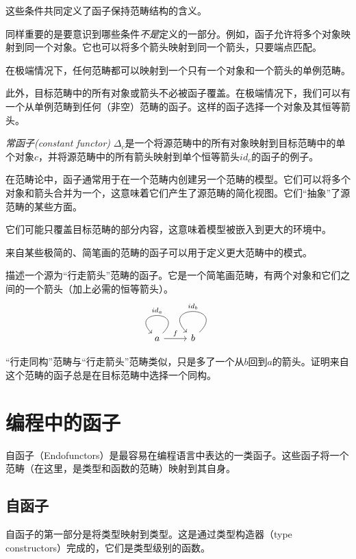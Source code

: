 \documentclass[DaoFP]{subfiles}
\begin{document}
这些条件共同定义了函子保持范畴结构的含义。

同样重要的是要意识到哪些条件\emph{不是}定义的一部分。例如，函子允许将多个对象映射到同一个对象。它也可以将多个箭头映射到同一个箭头，只要端点匹配。

在极端情况下，任何范畴都可以映射到一个只有一个对象和一个箭头的单例范畴。

此外，目标范畴中的所有对象或箭头不必被函子覆盖。在极端情况下，我们可以有一个从单例范畴到任何（非空）范畴的函子。这样的函子选择一个对象及其恒等箭头。

\emph{常函子(constant functor)} $\Delta_c$是一个将源范畴中的所有对象映射到目标范畴中的单个对象$c$，并将源范畴中的所有箭头映射到单个恒等箭头$id_c$的函子的例子。

在范畴论中，函子通常用于在一个范畴内创建另一个范畴的模型。它们可以将多个对象和箭头合并为一个，这意味着它们产生了源范畴的简化视图。它们“抽象”了源范畴的某些方面。

它们可能只覆盖目标范畴的部分内容，这意味着模型被嵌入到更大的环境中。

来自某些极简的、简笔画的范畴的函子可以用于定义更大范畴中的模式。

\begin{exercise}
描述一个源为“行走箭头”范畴的函子。它是一个简笔画范畴，有两个对象和它们之间的一个箭头（加上必需的恒等箭头）。
\[
 \begin{tikzcd}
 a 
  \arrow[loop,  "id_{a}"']
\arrow[r, "f"]
 & b
  \arrow[loop, "id_{b}"']
  \end{tikzcd}
\]
\end{exercise}
\begin{exercise}
“行走同构”范畴与“行走箭头”范畴类似，只是多了一个从$b$回到$a$的箭头。证明来自这个范畴的函子总是在目标范畴中选择一个同构。
\end{exercise}

\section{编程中的函子}

自函子（Endofunctors）是最容易在编程语言中表达的一类函子。这些函子将一个范畴（在这里，是类型和函数的范畴）映射到其自身。

\subsection{自函子}
自函子的第一部分是将类型映射到类型。这是通过类型构造器（type constructors）完成的，它们是类型级别的函数。
\end{document}
